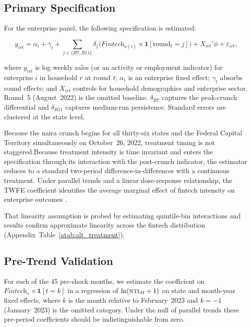 \subsection{Primary Specification}
\label{sub:firm_spec}

For the \NLPS{} enterprise panel, the following specification is estimated:

\begin{equation}
  y_{irt} = \alpha_i + \gamma_t
    + \sum_{j \in \{R7, R11\}} \delta_j
      \bigl(\textit{Fintech}_{s(i)} \times \mathbf{1}[\text{round}_t = j]\bigr)
    + X_{irt}'\phi + \varepsilon_{irt},
  \label{eq:firm}
\end{equation}

\noindent where $y_{irt}$ is log weekly sales (or an activity or employment
indicator) for enterprise $i$ in household $r$ at round $t$; $\alpha_i$ is an
enterprise fixed effect; $\gamma_t$ absorbs round effects; and $X_{irt}$
controls for household demographics and enterprise sector. Round~5
(August~2022) is the omitted baseline. $\delta_{R7}$ captures the peak-crunch
differential and $\delta_{R11}$ captures medium-run persistence. Standard
errors are clustered at the state level.

Because the naira crunch begins for all thirty-six states and the Federal
Capital Territory simultaneously on October~26, 2022, treatment timing is
not staggered.Because treatment intensity is time invariant and enters the specification through 
its interaction with the post-crunch indicator, the estimator reduces to a standard 
two-period difference-in-differences with a continuous treatment. Under parallel trends 
and a linear dose-response relationship, the TWFE coefficient identifies the average marginal effect 
of fintech intensity on enterprise outcomes \citep{wooldridge2021two}.

That linearity assumption is probed by estimating
quintile-bin interactions and results confirm approximate linearity across the
fintech distribution (Appendix~Table~\ref{atab:alt_treatment}).

\subsection{Pre-Trend Validation}
\label{sub:pretrendvalid}

For each of the 45 pre-shock months, we estimate the coefficient on
$\textit{Fintech}_s \times \mathbf{1}[t = k]$ in a regression of
$\ln(\textsc{ntl}_{lt}+1)$ on state and month-year fixed effects, where $k$ is the
month relative to February~2023 and $k=-1$ (January~2023) is the omitted
category. Under the null of parallel trends these pre-period coefficients
should be indistinguishable from zero.

